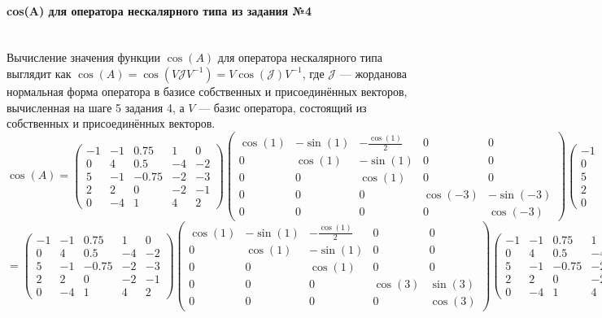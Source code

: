 \documentclass{article}
\begin{document}
\paragraph*{cos(A) для оператора нескалярного типа из задания №4} \, \\
Вычисление значения функции $\cos(A)$ для оператора нескалярного типа выглядит как $\cos(A) = \cos(V\mathcal{J}V^{-1}) = V\cos(\mathcal{J})V^{-1}$, где $\mathcal{J}$ --- жорданова нормальная форма оператора в базисе собственных и присоединённых векторов, вычисленная на шаге 5 задания 4, а $V$ --- базис оператора, состоящий из собственных и присоединённых векторов.
$$\cos(A) = \begin{pmatrix}
-1 & -1 & 0.75 & 1 & 0 \\
0 & 4 & 0.5 & -4 & -2\\
5 & -1 & -0.75 & -2 & -3\\
2 & 2 & 0 & -2 & -1\\
0 & -4 & 1 & 4 & 2
\end{pmatrix}\begin{pmatrix}
\cos(1) & -\sin(1) & -\frac{\cos(1)}{2} & 0 & 0 \\
0 & \cos(1) & -\sin(1) & 0 & 0 \\
0 & 0 & \cos(1) & 0 & 0 \\
0 & 0 & 0 & \cos(-3) & -\sin(-3) \\
0 & 0 & 0 & 0 & \cos(-3)
\end{pmatrix}\begin{pmatrix}
-1 & -1 & 0.75 & 1 & 0 \\
0 & 4 & 0.5 & -4 & -2\\
5 & -1 & -0.75 & -2 & -3\\
2 & 2 & 0 & -2 & -1\\
0 & -4 & 1 & 4 & 2
\end{pmatrix}^{-1} =$$
$$= \begin{pmatrix}
-1 & -1 & 0.75 & 1 & 0 \\
0 & 4 & 0.5 & -4 & -2\\
5 & -1 & -0.75 & -2 & -3\\
2 & 2 & 0 & -2 & -1\\
0 & -4 & 1 & 4 & 2
\end{pmatrix}\begin{pmatrix}
\cos(1) & -\sin(1) & -\frac{\cos(1)}{2} & 0 & 0 \\
0 & \cos(1) & -\sin(1) & 0 & 0 \\
0 & 0 & \cos(1) & 0 & 0 \\
0 & 0 & 0 & \cos(3) & \sin(3) \\
0 & 0 & 0 & 0 & \cos(3)
\end{pmatrix}\begin{pmatrix}
-1 & -1 & 0.75 & 1 & 0 \\
0 & 4 & 0.5 & -4 & -2\\
5 & -1 & -0.75 & -2 & -3\\
2 & 2 & 0 & -2 & -1\\
0 & -4 & 1 & 4 & 2
\end{pmatrix}^{-1} = $$
\end{document}
